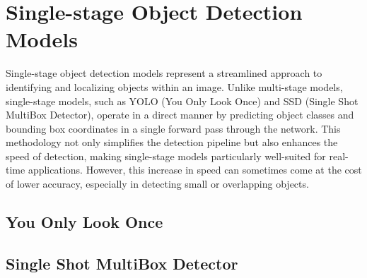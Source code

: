 \newpage
\section{Single-stage Object Detection Models}

Single-stage object detection models represent a streamlined approach to identifying and localizing objects within an image. Unlike multi-stage models, 
single-stage models, such as YOLO (You Only Look Once) and SSD (Single Shot MultiBox Detector), operate in a direct manner by predicting object classes and 
bounding box coordinates in a single forward pass through the network. This methodology not only simplifies the detection pipeline but also enhances the 
speed of detection, making single-stage models particularly well-suited for real-time applications. However, this increase in speed can sometimes come at 
the cost of lower accuracy, especially in detecting small or overlapping objects.

\subsection{You Only Look Once}

\subsection{Single Shot MultiBox Detector}

